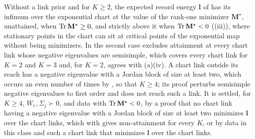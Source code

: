 Without a link prior and for \(K\geq2\), the expected record energy \(\mathbf l\) of
 has its infimum over the exponential chart at the value of the
rank-one minimizer \(\mathbf M^\star\), unattained, when \(\operatorname{Tr}\mathbf M^\star\geq0\), and strictly above it
when \(\operatorname{Tr}\mathbf M^\star<0\) ((iii)), where stationary points in the chart can
sit at critical points of the exponential map without being minimizers. In the second case
 excludes attainment at every chart link whose negative
eigenvalues are semisimple, which covers every chart link for \(K=2\) and \(K=3\) and, for \(K=2\), agrees
with (a)(iv). A chart link outside its reach has a negative eigenvalue with a
Jordan block of size at least two, which occurs an even number of times by
\citet[Theorem~1]{culver1966existence}, so that \(K\geq4\); its proof perturbs semisimple negative
eigenvalues to first order and does not reach such a link. It is settled, for \(K\geq4\),
\(W_e,\Sigma_j\succ0\), and data with \(\operatorname{Tr}\mathbf M^\star<0\), by a proof that no chart link having a
negative eigenvalue with a Jordan block of size at least two minimizes \(\mathbf l\) over the chart links,
which with  gives non-attainment for every \(K\), or by data in
this class and such a chart link that minimizes \(\mathbf l\) over the chart links.
